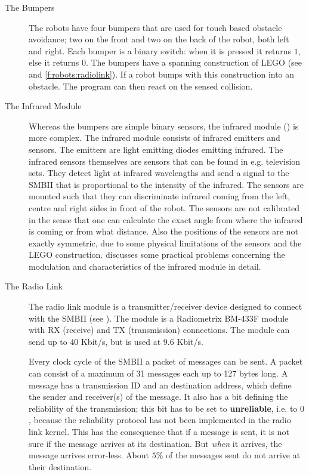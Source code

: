 \begin{description}
\item[The Bumpers] The robots have four bumpers that are used for touch based obstacle avoidance; two on the front and two on the back of the robot, both left and right. Each bumper is a binary switch: when it is pressed it returns $1$, else it returns $0$. The bumpers have a spanning construction of LEGO (see  and \ref{f:robots:radiolink}). If a robot bumps with this construction into an obstacle. The program can then react on the sensed collision.
\item[The Infrared Module] Whereas the bumpers are simple binary sensors, the infrared module () is more complex. The infrared module consists of infrared emitters and sensors. The emitters are light emitting diodes emitting infrared. The infrared sensors themselves are sensors that can be found in e.g. television sets. They detect light at infrared wavelengths and send a signal to the SMBII that is proportional to the intensity of the infrared. The sensors are mounted such that they can discriminate infrared coming from the left, centre and right sides in front of the robot. The sensors are not calibrated in the sense that one can calculate the exact angle from where the infrared is coming or from what distance. Also the  positions of the sensors are not exactly symmetric, due to some physical limitations of the sensors and the LEGO construction. \citet{vogt:1997} discusses some practical problems concerning the modulation and characteristics of the infrared module in detail.


\item[The Radio Link] The radio link module is a transmitter/receiver device designed to connect with the SMBII (see ). The module is a Radiometrix BM-433F module with RX (receive) and TX (transmission) connections. The module can send up to 40 Kbit/s, but is used at 9.6 Kbit/s. 

Every clock cycle of the SMBII a packet of messages can be sent. A packet can consist of a maximum of 31 messages each up to 127 bytes long. A message has a transmission ID and an destination address, which define the sender and receiver(s) of the message.  It also has a bit defining the reliability of the transmission; this bit has to be set to {\bf unreliable}, i.e. to $0$, because the reliability protocol has not been implemented in the radio link kernel. This has the consequence that if a message is sent, it is not sure if the message arrives at its destination. But {\em when} it arrives, the message arrives error-less. About $5\%$ of the messages sent do not arrive at their destination.


\end{description}

